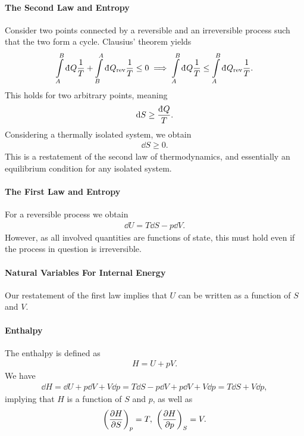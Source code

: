 \paragraph{The Second Law and Entropy}
Consider two points connected by a reversible and an irreversible process such that the two form a cycle. Clausius' theorem yields
\begin{align*}
	\intin{A}{B}{Q}{\frac{1}{T}} + \intin{B}{A}{Q_{\text{rev}}}{\frac{1}{T}} \leq 0 \implies \intin{A}{B}{Q}{\frac{1}{T}} \leq \intin{A}{B}{Q_{\text{rev}}}{\frac{1}{T}}.
\end{align*}
This holds for two arbitrary points, meaning
\begin{align*}
	\dd{S} \geq \frac{\din{Q}}{T}.
\end{align*}
Considering a thermally isolated system, we obtain
\begin{align*}
	\dd{S} \geq 0.
\end{align*}
This is a restatement of the second law of thermodynamics, and essentially an equilibrium condition for any isolated system.

\paragraph{The First Law and Entropy}
For a reversible process we obtain
\begin{align*}
	\dd{U} = T\dd{S} - p\dd{V}.
\end{align*}
However, as all involved quantities are functions of state, this must hold even if the process in question is irreversible.

\paragraph{Natural Variables For Internal Energy}
Our restatement of the first law implies that $U$ can be written as a function of $S$ and $V$.


\paragraph{Enthalpy}
The enthalpy is defined as 
\begin{align*}
	H = U + pV.
\end{align*}
We have
\begin{align*}
	\dd{H} = \dd{U} + p\dd{V} + V\dd{p} = T\dd{S} - p\dd{V} + p\dd{V} + V\dd{p} = T\dd{S} + V\dd{p},
\end{align*}
implying that $H$ is a function of $S$ and $p$, as well as
\begin{align*}
	\fix{\pdv{H}{S}}{p} = T,\ \fix{\pdv{H}{p}}{S} = V.
\end{align*}

